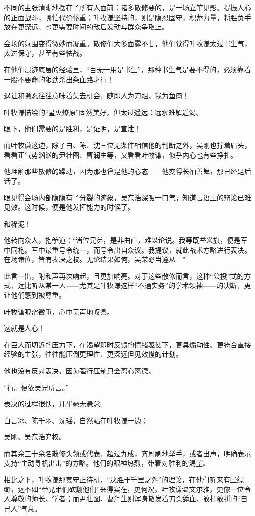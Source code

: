 不同的主张清晰地摆在了所有人面前：诸多散修要的，是一场立竿见影、提振人心的正面战斗，哪怕代价惨重；叶牧谦坚持的，则是隐忍固守，积蓄力量，将胜负手放在更深远、也更需要时间的敌后发动与群众争取上。

会场的氛围变得微妙而凝重。散修们大多面露不甘，他们觉得叶牧谦太过书生气，太过保守，甚至有些怯战。

在他们混迹底层的经验里，“百无一用是书生”，那种书生气是要不得的，必须靠着一股不要命的狠劲杀出条血路才行！

退让和隐忍往往意味着失去机会，随即人为刀俎、我为鱼肉！

叶牧谦描绘的“星火燎原”固然美好，但太过遥远：远水难解近渴。

眼下，他们需要的是胜利，是证明，是宣泄！

而叶牧谦这边，除了白、陈、沈三位无条件相信他的判断之外，吴刚也拧着眉头，看看正气势汹汹的尹壮图、曹润生等，又看看叶牧谦，似乎内心也有些挣扎。

他理解那些散修的躁动，因为那也曾是他的心态——他变得长袖善舞，那已经是后话了。

眼见得会场内部隐隐有了分裂的迹象，吴东浩深吸一口气，知道言语上的辩论已难见效。这时候，便是他发挥能力的时候了。

和稀泥！

他转向众人，抱拳道：“诸位兄弟，是非曲直，难以论说。我等既举义旗，便是军中同袍。军中最重号令统一，而号令出自众议。我提议，就此战术方略进行表决。在场诸位，皆有表决之权。无论结果如何，吴某必当遵从！”

此言一出，附和声再次响起，且更加响亮。对于这些散修而言，这种“公投”式的方式，远比听从某一人——尤其是叶牧谦这样“不通实务”的学术领袖——的决断，更让他们感到被尊重。

叶牧谦眼帘微垂，心中无声地叹息。

这就是人心！

在巨大而切近的压力下，在渴望即时反馈的情绪驱使下，更具煽动性、更符合直接经验的主张，往往能压倒更理性、更深远但见效慢的计划。

他也没有反对表决，因为强行压制只会离心离德。

“行。便依吴兄所言。”

表决的过程很快，几乎毫无悬念。

白言冰、陈千羽、沈瑶，自然站在叶牧谦一边；

吴刚、吴东浩弃权。

而其余三十余名散修头领或代表，超过九成，齐刷刷地举手，或者出声，明确表示支持“主动寻机出击”的方略。他们的眼神热烈，带着对胜利的渴望。

相比之下，叶牧谦那套守正待机、“决胜于千里之外”的理论，在他们听来有些缥缈，远不如“带兄弟们砍翻他们”来得实在。更何况，叶牧谦温文尔雅，更像一位令人尊敬的师长、学者；而尹壮图、曹润生则浑身散发着刀头舔血、敢打敢拼的“自己人”气息。

